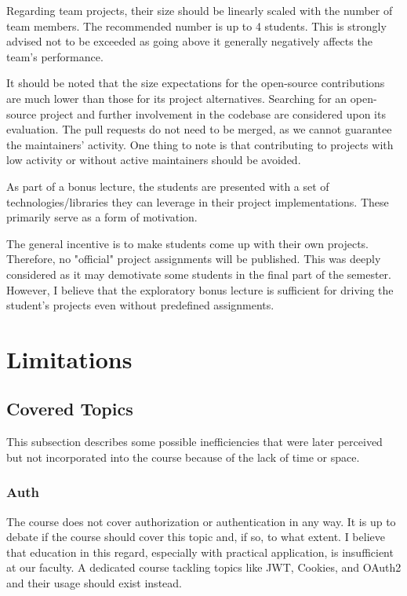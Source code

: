 \documentclass[
  digital,
  color,
  oneside,
  nosansbold,
  nocolorbold,
  lof,
  lot,
]{fithesis4}
\begin{document}
Regarding team projects, their size should be linearly scaled with the number of team members. The recommended number is up to 4 students. This is strongly advised not to be exceeded as going above it generally negatively affects the team's performance.

It should be noted that the size expectations for the open-source contributions are much lower than those for its project alternatives. Searching for an open-source project and further involvement in the codebase are considered upon its evaluation. The pull requests do not need to be merged, as we cannot guarantee the maintainers' activity. One thing to note is that contributing to projects with low activity or without active maintainers should be avoided.

As part of a bonus lecture, the students are presented with a set of technologies/libraries they can leverage in their project implementations. These primarily serve as a form of motivation.

The general incentive is to make students come up with their own projects. Therefore, no "official" project assignments will be published. This was deeply considered as it may demotivate some students in the final part of the semester. However, I believe that the exploratory bonus lecture is sufficient for driving the student's projects even without predefined assignments.

\section{Limitations}

\subsection{Covered Topics}

This subsection describes some possible inefficiencies that were later perceived but not incorporated into the course because of the lack of time or space.

\subsubsection{Auth}

The course does not cover authorization or authentication in any way. It is up to debate if the course should cover this topic and, if so, to what extent. I believe that education in this regard, especially with practical application, is insufficient at our faculty. A dedicated course tackling topics like JWT, Cookies, and OAuth2 and their usage should exist instead.
\end{document}
